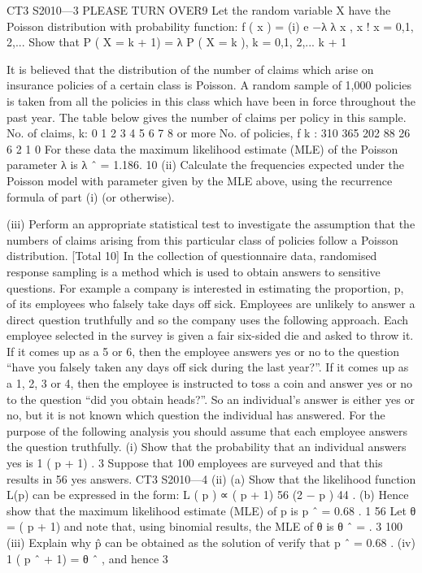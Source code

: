 \documentclass[a4paper,12pt]{article}
\begin{document}
\begin{enumerate}
CT3 S2010—3
PLEASE TURN OVER9
Let the random variable X have the Poisson distribution with probability function:
f ( x ) =
(i)
e −λ λ x
,
x !
x = 0,1, 2,...
Show that P ( X = k + 1) =
λ
P ( X = k ), k = 0,1, 2,...
k + 1

It is believed that the distribution of the number of claims which arise on insurance
policies of a certain class is Poisson. A random sample of 1,000 policies is taken
from all the policies in this class which have been in force throughout the past year.
The table below gives the number of claims per policy in this sample.
No. of claims, k: 0
1
2
3 4 5 6 7 8 or more
No. of policies, f k : 310 365 202 88 26 6 2 1
0
For these data the maximum likelihood estimate (MLE) of the Poisson parameter λ is
λ ˆ = 1.186.
10
(ii) Calculate the frequencies expected under the Poisson model with parameter
given by the MLE above, using the recurrence formula of part (i) (or
otherwise).

(iii) Perform an appropriate statistical test to investigate the assumption that the
numbers of claims arising from this particular class of policies follow a
Poisson distribution.
[Total 10]
In the collection of questionnaire data, randomised response sampling is a method
which is used to obtain answers to sensitive questions. For example a company is
interested in estimating the proportion, p, of its employees who falsely take days off
sick. Employees are unlikely to answer a direct question truthfully and so the
company uses the following approach.
Each employee selected in the survey is given a fair six-sided die and asked to throw
it. If it comes up as a 5 or 6, then the employee answers yes or no to the question
“have you falsely taken any days off sick during the last year?”. If it comes up as a 1,
2, 3 or 4, then the employee is instructed to toss a coin and answer yes or no to the
question “did you obtain heads?”. So an individual’s answer is either yes or no, but it
is not known which question the individual has answered.
For the purpose of the following analysis you should assume that each employee
answers the question truthfully.
(i)
Show that the probability that an individual answers yes is
1
( p + 1) .
3
Suppose that 100 employees are surveyed and that this results in 56 yes answers.
CT3 S2010—4
(ii)
(a)
Show that the likelihood function L(p) can be expressed in the form:
L ( p ) ∝ ( p + 1) 56 (2 − p ) 44 .
(b)
Hence show that the maximum likelihood estimate (MLE) of p is
p ˆ = 0.68 .
1
56
Let θ = ( p + 1) and note that, using binomial results, the MLE of θ is θ ˆ =
.
3
100
(iii)
Explain why p̂ can be obtained as the solution of
verify that p ˆ = 0.68 .
(iv)
1
( p ˆ + 1) = θ ˆ , and hence
3


\end{enumerate}
\end{document}

